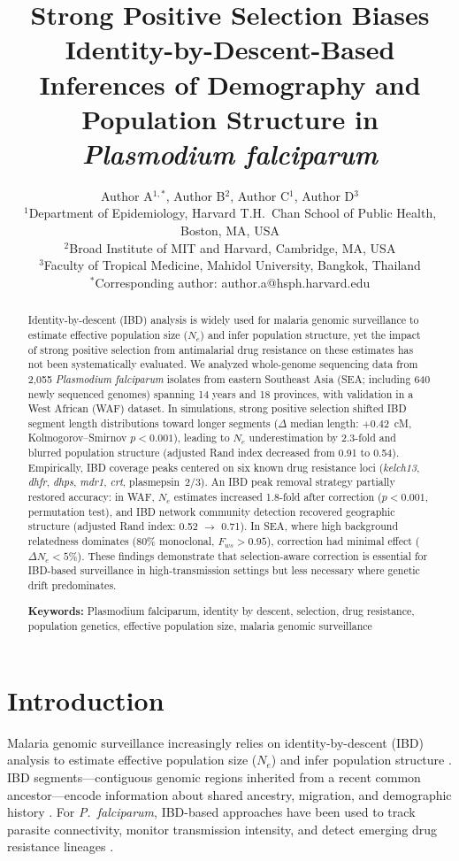 \documentclass[11pt]{article}
\title{Strong Positive Selection Biases Identity-by-Descent-Based Inferences of Demography and Population Structure in \textit{Plasmodium falciparum}}
\author{%
  Author A$^{1,*}$, Author B$^{2}$, Author C$^{1}$, Author D$^{3}$ \\[6pt]
  $^{1}$Department of Epidemiology, Harvard T.H.\ Chan School of Public Health, Boston, MA, USA \\
  $^{2}$Broad Institute of MIT and Harvard, Cambridge, MA, USA \\
  $^{3}$Faculty of Tropical Medicine, Mahidol University, Bangkok, Thailand \\
  $^{*}$Corresponding author: author.a@hsph.harvard.edu
}
\date{}
\begin{document}
\maketitle

\begin{abstract}
Identity-by-descent (IBD) analysis is widely used for malaria genomic surveillance to estimate effective population size ($N_e$) and infer population structure, yet the impact of strong positive selection from antimalarial drug resistance on these estimates has not been systematically evaluated. We analyzed whole-genome sequencing data from 2,055 \textit{Plasmodium falciparum} isolates from eastern Southeast Asia (SEA; including 640 newly sequenced genomes) spanning 14 years and 18 provinces, with validation in a West African (WAF) dataset. In simulations, strong positive selection shifted IBD segment length distributions toward longer segments ($\Delta$ median length: $+0.42$~cM, Kolmogorov--Smirnov $p < 0.001$), leading to $N_e$ underestimation by 2.3-fold and blurred population structure (adjusted Rand index decreased from 0.91 to 0.54). Empirically, IBD coverage peaks centered on six known drug resistance loci (\textit{kelch13}, \textit{dhfr}, \textit{dhps}, \textit{mdr1}, \textit{crt}, plasmepsin~2/3). An IBD peak removal strategy partially restored accuracy: in WAF, $N_e$ estimates increased 1.8-fold after correction ($p < 0.001$, permutation test), and IBD network community detection recovered geographic structure (adjusted Rand index: 0.52 $\to$ 0.71). In SEA, where high background relatedness dominates (80\% monoclonal, $F_{ws} > 0.95$), correction had minimal effect ($\Delta N_e < 5\%$). These findings demonstrate that selection-aware correction is essential for IBD-based surveillance in high-transmission settings but less necessary where genetic drift predominates.

\medskip
\noindent\textbf{Keywords:} Plasmodium falciparum, identity by descent, selection, drug resistance, population genetics, effective population size, malaria genomic surveillance
\end{abstract}

\section{Introduction}

Malaria genomic surveillance increasingly relies on identity-by-descent (IBD) analysis to estimate effective population size ($N_e$) and infer population structure \citep{taylor2017quantifying, henden2018identity}. IBD segments---contiguous genomic regions inherited from a recent common ancestor---encode information about shared ancestry, migration, and demographic history \citep{browning2018identity, browning2015ibdne}. For \textit{P.~falciparum}, IBD-based approaches have been used to track parasite connectivity, monitor transmission intensity, and detect emerging drug resistance lineages \citep{schaffner2018haplotype}.
\end{document}

